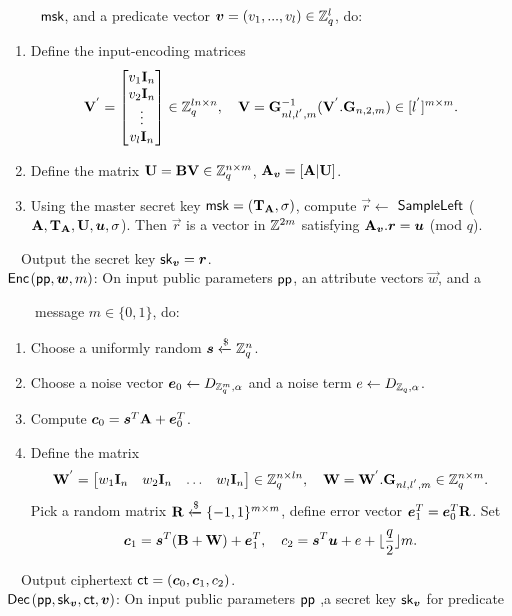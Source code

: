 ~~~~ $\mathsf{msk}$, and a predicate vector $\boldsymbol{v}=(v_{1},...,v_{l}) \in \mathbb{Z}^{l}_{q}$, do:
\begin{enumerate}
\item Define the input-encoding matrices
\begin{equation}
\mathbf{V}^{'}= \begin{bmatrix}
v_{1} \textbf{I}_{n}\\
v_{2} \textbf{I}_{n}\\
\vdots\\
v_{l} \textbf{I}_{n}
\end{bmatrix} \in \mathbb{Z}^{ln \times n}_{q},~~~ \mathbf{V}=\mathbf{G}^{-1}_{nl,l^{'},m}(\mathbf{V}^{'}.\mathbf{G}_{n,2,m}) \in [l^{'}]^{m \times m}.
\end{equation}

\item Define the  matrix $\mathbf{U}=\mathbf{BV} \in \mathbb{Z}^{n \times m}_{q}$, $\mathbf{A}_{\boldsymbol{v}}=[\mathbf{A}|\mathbf{U}]$.\

\item Using the master secret key $\mathsf{msk}=(\mathbf{T}_{\mathbf{A}},\sigma)$, compute $\vec{r}\leftarrow$ $\mathsf{SampleLeft}$ ($\textbf{A}, \mathbf{T}_{\mathbf{A}},\mathbf{U}, \boldsymbol{u},\sigma$). Then $\vec{r}$ is a vector in $\mathbb{Z}^{2m}$ satisfying $\mathbf{A}_{\boldsymbol{v}}.\boldsymbol{r}=\boldsymbol{u}$ (mod $q$).
\end{enumerate}
~~Output the secret key  $\mathsf{sk}_{\boldsymbol{v}}=\boldsymbol{r}$.\\[0.4cm]
$\mathsf{Enc}$$(\mathsf{pp},\boldsymbol{w},m)$: On input public parameters $\mathsf{pp}$, an attribute vectors $\vec{w}$, and a

~~~~message $m \in \{0,1\}$, do:
\begin{enumerate}
\item Choose a uniformly random $\boldsymbol{s}\xleftarrow{\$} \mathbb{Z}^{n}_{q}$.\

\item Choose a noise vector $\boldsymbol{e}_{0}\leftarrow D_{\mathbb{Z}^{m}_{q},\alpha}$ and a noise term $e\leftarrow D_{\mathbb{Z}_{q},\alpha}$.\

\item Compute $\boldsymbol{c}_{0}=\boldsymbol{s}^{T}\mathbf{A}+\boldsymbol{e}^{T}_{0}$.

\item Define the matrix
\begin{equation}
\mathbf{W}^{'}= \begin{bmatrix}
w_{1} \mathbf{I}_{n}&w_{2} \mathbf{I}_{n}&\ldots&w_{l} \mathbf{I}_{n}
\end{bmatrix} \in \mathbb{Z}^{n \times ln}_{q},~~~ \mathbf{W}=\mathbf{W}^{'}.\mathbf{G}_{nl,l^{'},m} \in \mathbb{Z}^{n \times m}_{q}.
\end{equation}
Pick a random matrix $\mathbf{R}\xleftarrow{\$} \{-1,1\}^{m \times m}$, define error vector $\boldsymbol{e}^{T}_{1}=\boldsymbol{e}^{T}_{0}\mathbf{R}$. Set
\begin{equation}
\boldsymbol{c}_{1}=\boldsymbol{s}^{T}(\mathbf{B}+\mathbf{W})+\boldsymbol{e}^{T}_{1},~~~c_{2}=\boldsymbol{s}^{T}\boldsymbol{u}+e+\lfloor \frac{q}{2} \rfloor m.
\end{equation}
\end{enumerate}
~~Output ciphertext  $\mathsf{ct}=(\boldsymbol{c}_{0},\boldsymbol{c}_{1},c_{2})$.\\[0.4cm]
$\mathsf{Dec}$$(\mathsf{pp},\mathsf{sk}_{\boldsymbol{v}},\mathsf{ct},\boldsymbol{v})$: On input public parameters $\mathsf{pp}$ ,a secret key $\mathsf{sk}_{\boldsymbol{v}}$ for predicate

